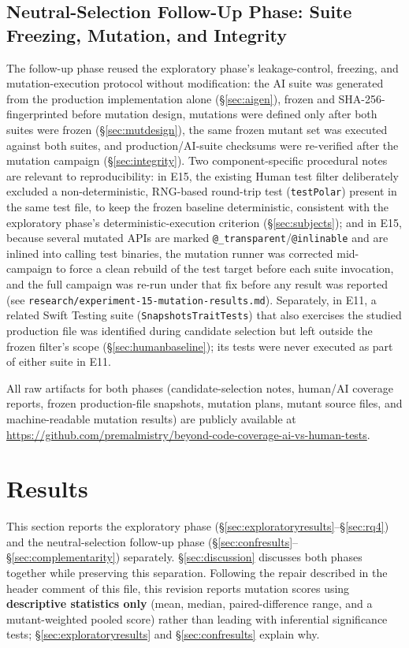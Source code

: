 \documentclass[10pt,conference]{IEEEtran}
\begin{document}
\subsection{Neutral-Selection Follow-Up Phase: Suite Freezing, Mutation, and Integrity}
\label{sec:confintegrity}
The follow-up phase reused the exploratory phase's leakage-control, freezing, and mutation-execution protocol without modification: the AI suite was generated from the production implementation alone (\S\ref{sec:aigen}), frozen and SHA-256-fingerprinted before mutation design, mutations were defined only after both suites were frozen (\S\ref{sec:mutdesign}), the same frozen mutant set was executed against both suites, and production/AI-suite checksums were re-verified after the mutation campaign (\S\ref{sec:integrity}). Two component-specific procedural notes are relevant to reproducibility: in E15, the existing Human test filter deliberately excluded a non-deterministic, RNG-based round-trip test (\texttt{testPolar}) present in the same test file, to keep the frozen baseline deterministic, consistent with the exploratory phase's deterministic-execution criterion (\S\ref{sec:subjects}); and in E15, because several mutated APIs are marked \texttt{@\_transparent}/\texttt{@inlinable} and are inlined into calling test binaries, the mutation runner was corrected mid-campaign to force a clean rebuild of the test target before each suite invocation, and the full campaign was re-run under that fix before any result was reported (see \texttt{research/experiment-15-mutation-results.md}). Separately, in E11, a related Swift Testing suite (\texttt{SnapshotsTraitTests}) that also exercises the studied production file was identified during candidate selection but left outside the frozen filter's scope (\S\ref{sec:humanbaseline}); its tests were never executed as part of either suite in E11.

All raw artifacts for both phases (candidate-selection notes, human/AI coverage reports, frozen production-file snapshots, mutation plans, mutant source files, and machine-readable mutation results) are publicly available at \url{https://github.com/premalmistry/beyond-code-coverage-ai-vs-human-tests}.

\section{Results}
\label{sec:results}

This section reports the exploratory phase (\S\ref{sec:exploratoryresults}--\S\ref{sec:rq4}) and the neutral-selection follow-up phase (\S\ref{sec:confresults}--\S\ref{sec:complementarity}) separately. \S\ref{sec:discussion} discusses both phases together while preserving this separation. Following the repair described in the header comment of this file, this revision reports mutation scores using \textbf{descriptive statistics only} (mean, median, paired-difference range, and a mutant-weighted pooled score) rather than leading with inferential significance tests; \S\ref{sec:exploratoryresults} and \S\ref{sec:confresults} explain why.
\end{document}
